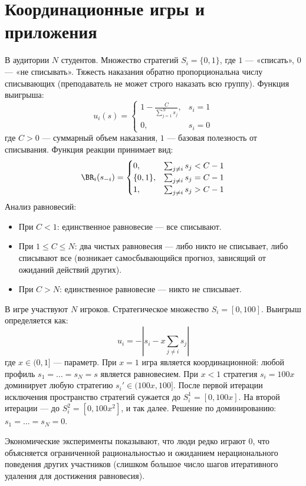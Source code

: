 \section{Координационные игры и приложения}

\begin{example}
В аудитории $N$ студентов. Множество стратегий $S_i = \{0, 1\}$, где $1$ — «списать», $0$ — «не списывать». Тяжесть наказания обратно пропорциональна числу списывающих (преподаватель не может строго наказать всю группу). Функция выигрыша:
\begin{equation}
    u_i(s) = 
    \begin{cases}
        1 - \frac{C}{\sum_{j=1}^N s_j}, & s_i = 1 \\
        0, & s_i = 0
    \end{cases}
\end{equation}
где $C > 0$ — суммарный объем наказания, $1$ — базовая полезность от списывания. Функция реакции принимает вид:
\begin{equation}
    \BR_i(s_{-i}) =
    \begin{cases}
        0, & \sum_{j \neq i} s_j < C - 1 \\
        \{0, 1\}, & \sum_{j \neq i} s_j = C - 1 \\
        1, & \sum_{j \neq i} s_j > C - 1
    \end{cases}
\end{equation}
Анализ равновесий:
\begin{itemize}
    \item При $C < 1$: единственное равновесие — все списывают.
    \item При $1 \le C \le N$: два чистых равновесия — либо никто не списывает, либо списывают все (возникает самосбывающийся прогноз, зависящий от ожиданий действий других).
    \item При $C > N$: единственное равновесие — никто не списывает.
\end{itemize}
\end{example}

\begin{example}
В игре участвуют $N$ игроков. Стратегическое множество $S_i = [0, 100]$. Выигрыш определяется как:
\begin{equation}
    u_i = - \left| s_i - x \sum_{j \neq i} s_j \right|
\end{equation}
где $x \in (0, 1]$ — параметр. 
При $x = 1$ игра является координационной: любой профиль $s_1 = \dots = s_N = s$ является равновесием.
При $x < 1$ стратегия $s_i = 100x$ доминирует любую стратегию $s_i' \in (100x, 100]$. После первой итерации исключения пространство стратегий сужается до $S_i^1 = [0, 100x]$. На второй итерации — до $S_i^2 = [0, 100x^2]$, и так далее. Решение по доминированию: $s_1 = \dots = s_N = 0$. 

Экономические эксперименты показывают, что люди редко играют $0$, что объясняется ограниченной рациональностью и ожиданием нерационального поведения других участников (слишком большое число шагов итеративного удаления для достижения равновесия).
\end{example}

